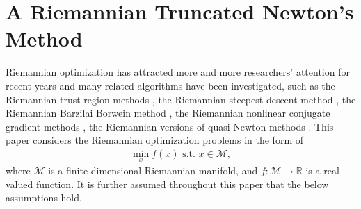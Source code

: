\documentclass[11pt]{article}
\newcommand{\zwhcomm}[2]{{\sf\color{purple} #1}{\sf\color{blue} #2}}
\numberwithin{equation}{section}
\begin{document}


\section{A Riemannian Truncated Newton's Method} \label{RieNew}

Riemannian optimization has attracted more and more researchers' attention for recent years and many related algorithms have been investigated, such as the Riemannian trust-region methods \cite{Absil2007TrustRegionMO}, the Riemannian steepest descent method \cite{AbsMahSep2008}, the Riemannian Barzilai Borwein method \cite{Iannazzo2018TheRB}, the Riemannian nonlinear conjugate gradient methods \cite{ring_optimization_2012, Sato2014ADR, Sato2013ANG, Zhu2017ARC}, the Riemannian versions of quasi-Newton methods \cite{Huang2015ABC,Huang2015ARS,huang_riemannian_2018,Huang2022ALR}. %
This paper considers the Riemannian optimization problems in the form of
\begin{equation} \label{RieNew-Prob}
  \begin{aligned} 
    \min_{x} f(x) \text{ s.t. }x\in \mathcal{M},
  \end{aligned}
\end{equation}
where $\mathcal{M}$ is a finite dimensional Riemannian manifold, and $f:\mathcal{M} \rightarrow \mathbb{R}$ is a real-valued function. It is further assumed throughout this paper that the below assumptions hold.
\end{document}
